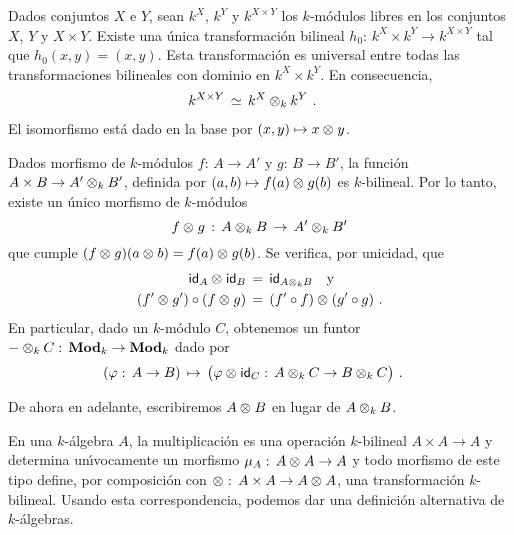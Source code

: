 \begin{propoProductoTensorialDeModulos}%
	\label{propo:productotensorialdemoduloslibres}
	Dados conjuntos $X$ e $Y$, sean $k^X$, $k^Y$ y $k^{X\times Y}$ los
	$k$-m\'{o}dulos libres en los conjuntos $X$, $Y$ y $X\times Y$.
	Existe una \'{u}nica transformaci\'{o}n bilineal
	$h_0:\,k^X\times k^Y\rightarrow k^{X\times Y}$ tal que
	$h_0(x,y)=(x,y)$. Esta transformaci\'{o}n es universal entre todas
	las transformaciones bilineales con dominio en $k^X\times k^Y$. En
	consecuencia,
	\begin{align*}
		k^{X\times Y} & \,\simeq\, k^X\tensor[k]k^Y
		\text{ .}
	\end{align*}
	El isomorfismo est\'{a} dado en la base por $(x,y)\mapsto x\tensor y$.
\end{propoProductoTensorialDeModulos}

\begin{obsProductoTensorialDeModulos}%
	\label{obs:productotensorialdemodulosesfuntorial}
	Dados morfismo de $k$-m\'{o}dulos $f:\,A\rightarrow A'$ y
	$g:\,B\rightarrow B'$, la funci\'{o}n
	$A\times B\rightarrow A'\tensor[k]B'$, definida por
	$(a,b)\mapsto f(a)\tensor g(b)$ es $k$-bilineal. Por lo tanto, existe
	un \'{u}nico morfismo de $k$-m\'{o}dulos
	\begin{equation}
		\label{eq:productotensorialdemorfismosdemodulos}
		f\tensor g \,:\,A\tensor[k]B\,\rightarrow\,A'\tensor[k]B'
	\end{equation}
	que cumple $(f\tensor g)(a\tensor b)=f(a)\tensor g(b)$. Se verifica,
	por unicidad, que
	\begin{align*}
		\id[A]\tensor\id[B] & \,=\,\id[{A\tensor[k]B}] \quad\text{y} \\
		(f'\tensor g')\circ (f\tensor g) & \,=\,
			(f'\circ f)\tensor (g'\circ g)
		\text{ .}
	\end{align*}
	En particular, dado un $k$-m\'{o}dulo $C$, obtenemos un funtor
	$-\tensor[k]C:\,\Mod[k]\rightarrow\Mod[k]$ dado por
	\begin{align*}
		(\varphi:\,A\rightarrow B) & \,\mapsto\,
			\big(\varphi\tensor\id[C]:\,
				A\tensor[k]C\rightarrow B\tensor[k]C\big)
		\text{ .}
	\end{align*}
\end{obsProductoTensorialDeModulos}

De ahora en adelante, escribiremos $A\tensor B$ en lugar de $A\tensor[k]B$.

\begin{obsAlgebra}\label{obs:algebra}
	En una $k$-\'{a}lgebra $A$, la multiplicaci\'{o}n es una operaci\'{o}n
	$k$-bilineal $A\times A\rightarrow A$ y determina un\'{\i}vocamente un
	morfismo $\mu_A:\,A\tensor A\rightarrow A$ y todo morfismo de este tipo
	define, por composici\'{o}n con
	$\tensor:\,A\times A\rightarrow A\tensor A$, una transformaci\'{o}n
	$k$-bilineal. Usando esta correspondencia, podemos dar una
	definici\'{o}n alternativa de $k$-\'{a}lgebras.
\end{obsAlgebra}

